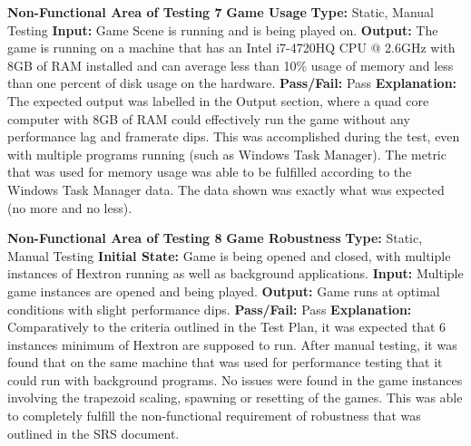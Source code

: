 \documentclass[12pt, titlepage]{article}
\begin{document}
\noindent \textbf{Non-Functional Area of Testing 7}
\newline
\textbf{Game Usage}
\newline
\textbf{Type:} Static, Manual Testing
\newline
\textbf{Input:} Game Scene is running and is being played on.
\newline
\textbf{Output:} The game is running on a machine that has an Intel i7-4720HQ CPU @ 2.6GHz with 8GB of RAM installed and can average less than 10\% usage of memory and less than one percent of disk usage on the hardware.
\newline
\textbf{Pass/Fail:} Pass
\newline 
\textbf{Explanation:} The expected output was labelled in the Output section, where a quad core computer with 8GB of RAM could effectively run the game without any performance lag and framerate dips. This was accomplished during the test, even with multiple programs running (such as Windows Task Manager). The metric that was used for memory usage was able to be fulfilled according to the Windows Task Manager data. The data shown was exactly what was expected (no more and no less).\newline \newline

\noindent \textbf{Non-Functional Area of Testing 8}
\newline
\textbf{Game Robustness}
\newline
\textbf{Type:} Static, Manual Testing
\newline
\textbf{Initial State:} Game is being opened and closed, with multiple instances of Hextron running as well as background applications.
\newline 
\textbf{Input:} Multiple game instances are opened and being played.
\newline
\textbf{Output:} Game runs at optimal conditions with slight performance dips.
\newline
\textbf{Pass/Fail:} Pass
\newline
\textbf{Explanation:} Comparatively to the criteria outlined in the Test Plan, it was expected that 6 instances minimum of Hextron are supposed to run. After manual testing, it was found that on the same machine that was used for performance testing that it could run with background programs. No issues were found in the game instances involving the trapezoid scaling, spawning or resetting of the games. This was able to completely fulfill the non-functional requirement of robustness that was outlined in the SRS document. 
\end{document}
